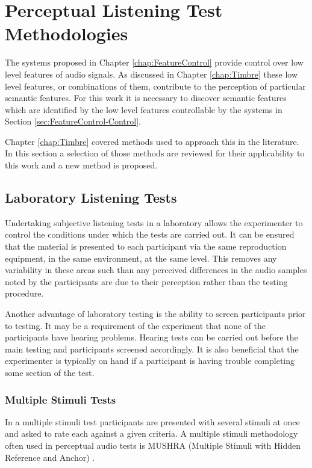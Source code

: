 \chapter{Perceptual Listening Test Methodologies}
\label{chap:ListeningTests}
	The systems proposed in Chapter \ref{chap:FeatureControl} provide control over low level features of audio signals.
	As discussed in Chapter \ref{chap:Timbre} these low level features, or combinations of them, contribute to the
	perception of particular semantic features. For this work it is necessary to discover semantic features which are
	identified by the low level features controllable by the systems in Section \ref{sec:FeatureControl-Control}.

	Chapter \ref{chap:Timbre} covered methods used to approach this in the literature. In this section a selection
	of those methods are reviewed for their applicability to this work and a new method is proposed.

\section{Laboratory Listening Tests}
\label{sec:ListeningTests-LaboratoryListeningTests}
	Undertaking subjective listening tests in a laboratory allows the experimenter to control the conditions under which
	the tests are carried out. It can be ensured that the material is presented to each participant via the same
	reproduction equipment, in the same environment, at the same level. This removes any variability in these areas such
	than any perceived differences in the audio samples noted by the participants are due to their perception rather
	than the testing procedure.

	Another advantage of laboratory testing is the ability to screen participants prior to testing. It may be a
	requirement of the experiment that none of the participants have hearing problems. Hearing tests can be carried out
	before the main testing and participants screened accordingly. It is also beneficial that the experimenter is
	typically on hand if a participant is having trouble completing some section of the test.

	\subsection{Multiple Stimuli Tests}
        \label{sec:ListeningTests-LaboratoryListeningTests-MultipleStimuliTests} 
		In a multiple stimuli test participants are presented with several stimuli at once and asked to rate each
		against a given criteria. A multiple stimuli methodology often used in perceptual audio tests is MUSHRA
		(Multiple Stimuli with Hidden Reference and Anchor) \citep{mushra2014}. 

